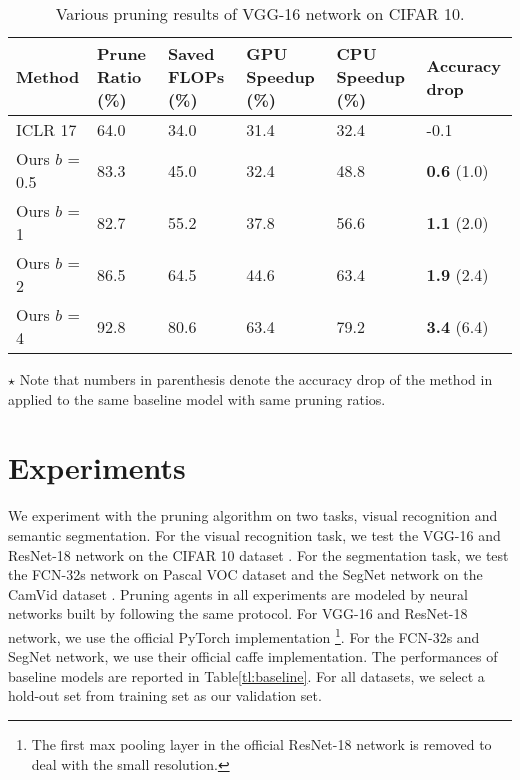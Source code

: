 \documentclass[10pt,twocolumn,letterpaper]{article}
\begin{document}
\begin{table*}[t]
  \caption{Various pruning results of VGG-16 network on CIFAR 10.}
  \label{tl:vgg_cifar}
  \centering
  \begin{tabular}{llllll}
    \toprule

    Method     & Prune Ratio (\%)  & Saved FLOPs (\%)  & GPU Speedup (\%) &  CPU Speedup (\%) & Accuracy drop \\
    \midrule
    
    ICLR 17 \cite{iclr17}  & 64.0  &  34.0	& 31.4 &32.4& -0.1   \\
    \hline
    Ours $b$ = 0.5 	   & 83.3	& 45.0 & 32.4	& 48.8 &  \textbf{0.6} (1.0)	\\ 
    Ours $b$ = 1 	   &  82.7	& 55.2  & 37.8	&56.6& \textbf{1.1} (2.0)	\\
    Ours $b$ = 2 	   & 86.5	& 64.5 & 44.6	&63.4& \textbf{1.9} (2.4)		\\
    Ours $b$ = 4 	   & 92.8	& 80.6 & 63.4	&79.2& \textbf{3.4} (6.4)		\\    
    \bottomrule
  \end{tabular}
  
      \begin{tablenotes}
      \small
      \item $\star$ Note that numbers in parenthesis denote the accuracy drop of the method in \cite{iclr17} applied to the same baseline model with same pruning ratios.
    \end{tablenotes}
    
\end{table*}







\section{Experiments}
\label{sec:exp}




We experiment with the pruning algorithm on two tasks, visual recognition and semantic segmentation. For the visual recognition task, we test the VGG-16 \cite{vgg} and ResNet-18 \cite{resnet} network on the CIFAR 10 dataset \cite{cifar}. For the segmentation task, we test the FCN-32s network \cite{fcn} on Pascal VOC dataset \cite{pascal} and the SegNet network \cite{segnet} on the CamVid dataset \cite{camvid}. Pruning agents in all experiments are modeled by neural networks built by following the same protocol. For VGG-16 and ResNet-18 network, we use the official PyTorch implementation \footnote{The first max pooling layer in the official ResNet-18 network is removed to deal with the small resolution.}. For the FCN-32s and SegNet network, we use their official caffe \cite{caffe} implementation. The performances of baseline models are reported in Table\ref{tl:baseline}. For all datasets, we select a hold-out set from training set as our validation set.
\end{document}
